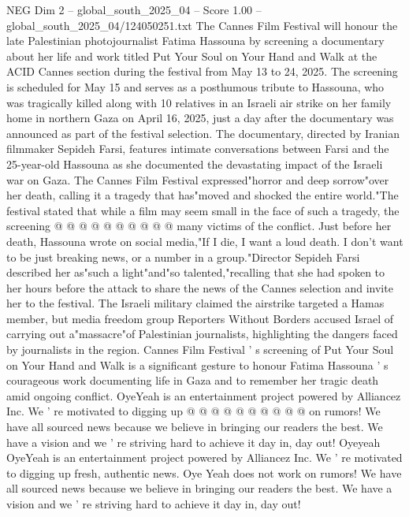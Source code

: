 \begin{textsample}{NEG Dim 2 – global\_south\_2025\_04 – Score 1.00 – global\_south\_2025\_04/124050251.txt}  \label{ex:f2_neg_175}
The Cannes Film Festival will honour the late Palestinian photojournalist Fatima Hassouna by screening a documentary about her life and work titled Put Your Soul on Your Hand and Walk at the ACID Cannes section during the festival from May 13 to 24, 2025.
The screening is scheduled for May 15 and serves as a posthumous tribute to Hassouna, who was tragically killed along with 10 relatives in an Israeli air strike on her family home in northern Gaza on April 16, 2025, just a day after the documentary was announced as part of the festival selection.
The documentary, directed by Iranian filmmaker Sepideh Farsi, features intimate conversations between Farsi and the 25-year-old Hassouna as she documented the devastating impact of the Israeli war on Gaza.
The Cannes Film Festival expressed"horror and deep sorrow"over her death, calling it a tragedy that has"moved and shocked the entire world."The festival stated that while a film may seem small in the face of such a tragedy, the screening @ @ @ @ @ @ @ @ @ @ many victims of the conflict.
Just before her death, Hassouna wrote on social media,"If I die, I want a loud death.
I don't want to be just breaking news, or a number in a group."Director Sepideh Farsi described her as"such a light"and"so talented,"recalling that she had spoken to her hours before the attack to share the news of the Cannes selection and invite her to the festival.
The Israeli military claimed the airstrike targeted a Hamas member, but media freedom group Reporters Without Borders accused Israel of carrying out a"massacre"of Palestinian journalists, highlighting the dangers faced by journalists in the region.
Cannes Film Festival ' s screening of Put Your Soul on Your Hand and Walk is a significant gesture to honour Fatima Hassouna ' s courageous work documenting life in Gaza and to remember her tragic death amid ongoing conflict.
OyeYeah is an entertainment project powered by Alliancez Inc.
We ' re motivated to digging up @ @ @ @ @ @ @ @ @ @ on rumors!
We have all sourced news because we believe in bringing our readers the best.
We have a vision and we ' re striving hard to achieve it day in, day out!
Oyeyeah OyeYeah is an entertainment project powered by Alliancez Inc.
We ' re motivated to digging up fresh, authentic news.
Oye Yeah does not work on rumors!
We have all sourced news because we believe in bringing our readers the best.
We have a vision and we ' re striving hard to achieve it day in, day out!

\end{textsample}
